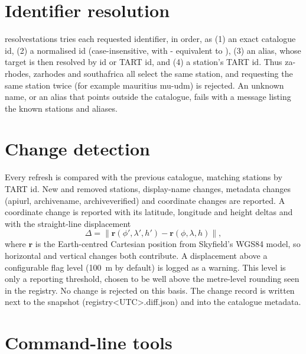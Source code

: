\documentclass[11pt,a4paper]{article}
\newcommand{\code}[1]{{\ttfamily\def\_{\textunderscore\allowbreak}#1}}
\newcommand{\vect}[1]{\mathbf{#1}}
\begin{document}
\section{Identifier resolution}

\code{resolve\_stations} tries each requested identifier, in order, as (1)
an exact catalogue id, (2) a normalised id (case-insensitive, with
\code{-} equivalent to \code{\_}), (3) an alias, whose target is then
resolved by id or TART id, and (4) a station's TART id. Thus
\code{za-rhodes}, \code{za\_rhodes} and \code{south\_africa} all select the
same station, and requesting the same station twice (for example
\code{mauritius mu-udm}) is rejected. An unknown name, or an alias that
points outside the catalogue, fails with a message listing the known
stations and aliases.

\section{Change detection}

Every refresh is compared with the previous catalogue, matching stations by
TART id. New and removed stations, display-name changes, metadata changes
(\code{api\_url}, \code{archive\_name}, \code{archive\_verified}) and
coordinate changes are reported. A coordinate change is reported with its
latitude, longitude and height deltas and with the straight-line
displacement
\begin{equation}
\Delta = \lVert \vect r(\phi',\lambda',h') - \vect r(\phi,\lambda,h)\rVert,
\end{equation}
where $\vect r$ is the Earth-centred Cartesian position from Skyfield's
WGS84 model, so horizontal and vertical changes both contribute. A
displacement above a configurable flag level (\SI{100}{\metre} by default)
is logged as a warning. This level is only a reporting threshold, chosen to
be well above the metre-level rounding seen in the registry. No change is
rejected on this basis. The change record is written next to the snapshot
(\code{registry\_<UTC>.diff.json}) and into the catalogue metadata.

\section{Command-line tools}
\end{document}

